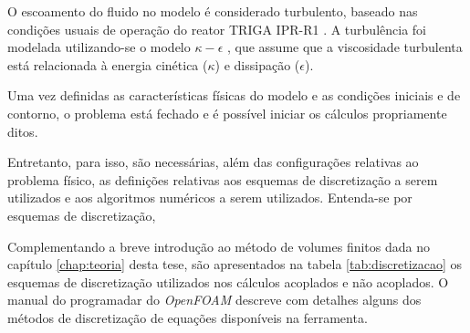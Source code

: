 O escoamento do fluido no modelo é considerado turbulento, baseado nas condições usuais de operação
do reator TRIGA IPR-R1 \cite{Veloso2005}. A turbulência foi modelada utilizando-se o modelo
$\kappa-\epsilon$ \cite{Launder1974}, que assume que a viscosidade turbulenta está relacionada
à energia cinética ($\kappa$) e dissipação ($\epsilon$).

Uma vez definidas as características físicas do modelo e as condições iniciais e de contorno,
o problema está fechado e é possível iniciar os cálculos propriamente ditos.

Entretanto, para isso, são necessárias, além das configurações relativas
ao problema físico, as definições relativas aos esquemas de discretização a serem utilizados e aos
algoritmos numéricos a serem utilizados. Entenda-se por esquemas de discretização, 

Complementando a breve introdução ao método de volumes finitos
dada no capítulo \ref{chap:teoria} desta tese, são apresentados na tabela \ref{tab:discretizacao}
os esquemas de discretização utilizados nos cálculos acoplados e não acoplados. O manual
do programadar do \textit{OpenFOAM} \cite[Seção 2.4]{OpenFOAM2015b} descreve com detalhes alguns
dos métodos de discretização de equações disponíveis na ferramenta.



